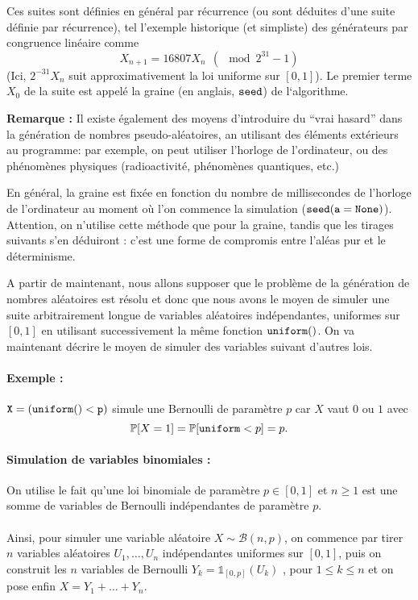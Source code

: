 \documentclass[a4paper,12pt]{book}
\begin{document}
Ces suites sont définies en général par récurrence (ou sont déduites d’une suite définie par récurrence), tel l’exemple
historique (et simpliste) des générateurs par congruence linéaire comme
$$X_{n+1} = 16807 X_{n}\ \ (\mod 2^{31} - 1)$$
(Ici, $2^{-31} X_n$ suit approximativement la loi uniforme sur $[0,1]$).
Le premier terme $X_0$ de la suite est appelé la graine (en anglais, $\tt seed$) de l‘algorithme.

\textbf{Remarque :} Il existe \'egalement des moyens d'introduire du ``vrai hasard'' dans la g\'en\'eration de nombres pseudo-al\'eatoires,
an utilisant des \'el\'ements ext\'erieurs au programme: par exemple, on peut utiliser l'horloge de l'ordinateur, ou
des ph\'enom\`enes physiques (radioactivit\'e, ph\'enom\`enes quantiques, etc.)

En général, la graine est fixée en fonction du nombre de millisecondes de l’horloge
de l’ordinateur au moment où l’on commence la simulation ($\tt seed(a=None)$). Attention, on n’utilise cette méthode que pour la graine,
tandis que les tirages suivants s’en déduiront : c’est une forme de compromis entre l'aléas pur et le déterminisme.

A partir de maintenant, nous allons supposer que le probl\`eme de la g\'en\'eration de nombres al\'eatoires est
r\'esolu et donc que nous avons le moyen de simuler une suite arbitrairement longue de variables al\'eatoires
ind\'ependantes, uniformes sur $[0,1]$ en utilisant successivement la même fonction $\tt uniform()$. On va maintenant décrire le moyen de simuler des variables suivant d'autres
lois.

\paragraph{Exemple :} $\tt X=(uniform()<p)$ simule une Bernoulli de paramètre $p$ car $X$ vaut $0$ ou $1$ avec
$$\mathbb{P}[X=1]=\mathbb{P}[{\tt uniform}<p]=p.$$

\paragraph{Simulation de variables binomiales :} On utilise le fait qu'une loi binomiale de param\`etre $p \in [0,1]$ et
$n \geq 1$ est une somme de variables de Bernoulli ind\'ependantes de param\`etre $p$. \\ \\
Ainsi, pour simuler une variable aléatoire $X \sim \mathcal{B}(n,p)$, on commence par tirer $n$ variables aléatoires $U_1,\dots,U_n$ indépendantes uniformes sur $[0,1]$, puis on construit les $n$ variables de Bernoulli $Y_k=\mathds{1}_{[0,p]}(U_k)$ , pour $1\le k\le n$ et on pose enfin
$X=Y_1+\dots +Y_n$.
\end{document}
